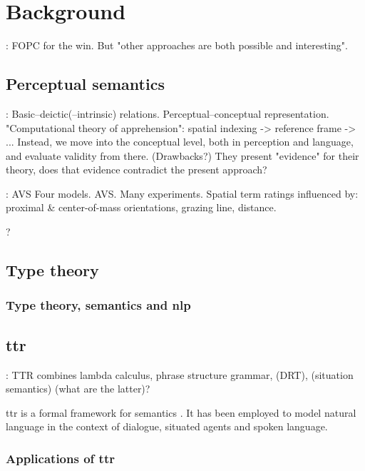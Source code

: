 \documentclass[11pt, a4paper]{article}
\begin{document}
\section{Background}
\label{sec:background}

\cite{BlackburnComputationalsemantics2003}:
FOPC for the win. But "other approaches are both possible and interesting".

\subsection{Perceptual semantics}

\cite{LoganComputationalAnalysisApprehension1996}:
Basic–deictic(–intrinsic) relations.
Perceptual–conceptual representation.
"Computational theory of apprehension": spatial indexing -> reference frame -> ... Instead, we move into the conceptual level, both in perception and language, and evaluate validity from there.
(Drawbacks?)
They present "evidence" for their theory, does that evidence contradict the present approach?

\cite{RegierGroundingspatiallanguage2001a}:
AVS
Four models. AVS.
Many experiments.
Spatial term ratings influenced by: proximal \& center-of-mass orientations, grazing line, distance.

\cite{PustejovskyPerceptualsemanticsconstruction1990}?

\subsection{Type theory}

\subsubsection{Type theory, semantics and \gls{nlp}}

\subsection{\Gls{ttr}}

\citep{CooperRecordsRecordTypes2005}:
TTR combines lambda calculus, phrase structure grammar, (DRT), (situation semantics) (what are the latter)?

\gls{ttr} is a formal framework for semantics \citep{CooperRecordsRecordTypes2005}.
It has been employed to model natural language in the context of dialogue, situated agents and spoken language.

\subsubsection{Applications of \gls{ttr}}
\end{document}
